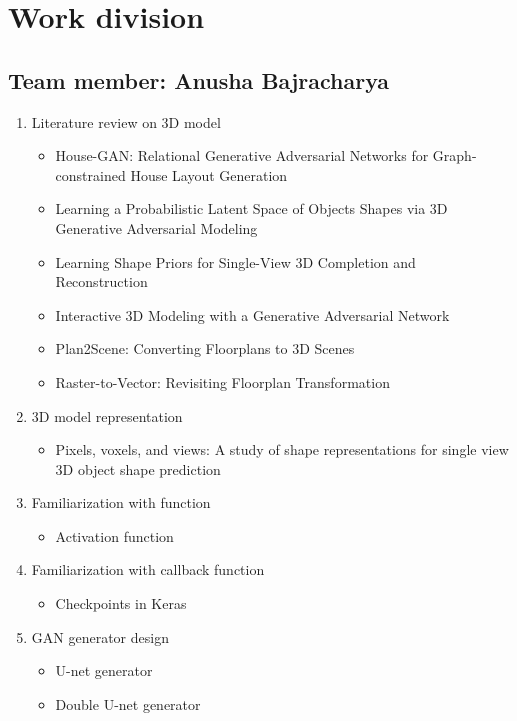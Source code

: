 \section{Work division}
\subsection{Team member: Anusha Bajracharya}
\begin{enumerate}[label=\alph*.]
    \item Literature review on 3D model
          \begin{itemize}
              \item House-GAN: Relational Generative Adversarial Networks for Graph-constrained House Layout Generation
              \item Learning a Probabilistic Latent Space of Objects Shapes via 3D Generative Adversarial Modeling
              \item Learning Shape Priors for Single-View 3D Completion and Reconstruction
              \item Interactive 3D Modeling with a Generative Adversarial Network
              \item Plan2Scene: Converting Floorplans to 3D Scenes
              \item Raster-to-Vector: Revisiting Floorplan Transformation
          \end{itemize}
    \item 3D model representation
          \begin{itemize}
            \item Pixels, voxels, and views: A study of shape representations for single view 3D object shape prediction
          \end{itemize}
    \item{Familiarization with function}
          \begin{itemize}
              \item Activation function
          \end{itemize}
    \item{Familiarization with callback function}
          \begin{itemize}
              \item Checkpoints in Keras
          \end{itemize}
    \item GAN generator design
          \begin{itemize}
              \item U-net generator
              \item Double U-net generator
          \end{itemize}
\end{enumerate}
